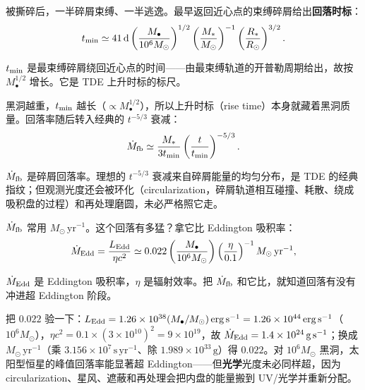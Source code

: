 被撕碎后，一半碎屑束缚、一半逃逸。最早返回近心点的束缚碎屑给出\textbf{回落时标}：
\begin{equation}
  t_{\rm min}\simeq
  41\,{\rm d}
  \left(\frac{M_\bullet}{10^6M_\odot}\right)^{1/2}
  \left(\frac{M_\ast}{M_\odot}\right)^{-1}
  \left(\frac{R_\ast}{R_\odot}\right)^{3/2}.
  \label{eq:e20-tde-fallback-time}
\end{equation}
\begin{formulaexplain}
\(t_{\rm min}\) 是最束缚碎屑绕回近心点的时间——由最束缚轨道的开普勒周期给出，故按 \(M_\bullet^{1/2}\) 增长。它是 TDE 上升时标的标尺。
\end{formulaexplain}
黑洞越重，\(t_{\rm min}\) 越长（\(\propto M_\bullet^{1/2}\)），所以上升时标（rise time）本身就藏着黑洞质量。回落率随后转入经典的 \(t^{-5/3}\) 衰减：
\begin{equation}
  \dot M_{\rm fb}\simeq
  \frac{M_\ast}{3t_{\rm min}}
  \left(\frac{t}{t_{\rm min}}\right)^{-5/3}.
  \label{eq:e20-tde-fallback-rate}
\end{equation}
\begin{formulaexplain}
\(\dot M_{\rm fb}\) 是碎屑回落率。理想的 \(t^{-5/3}\) 衰减来自碎屑能量的均匀分布，是 TDE 的经典指纹；但观测光度还会被环化（circularization，碎屑轨道相互碰撞、耗散、绕成吸积盘的过程）和再处理磨圆，未必严格照它走。
\end{formulaexplain}
\(\dot M_{\rm fb}\) 常用 \(M_\odot\,\mathrm{yr^{-1}}\)。这个回落有多猛？拿它比 Eddington 吸积率：
\begin{equation}
  \dot M_{\rm Edd}
  =
  \frac{L_{\rm Edd}}{\eta c^2}
  \simeq
  0.022
  \left(\frac{M_\bullet}{10^6M_\odot}\right)
  \left(\frac{\eta}{0.1}\right)^{-1}
  M_\odot\,{\rm yr^{-1}} ,
  \label{eq:e20-eddington-rate}
\end{equation}
\begin{formulaexplain}
\(\dot M_{\rm Edd}\) 是 Eddington 吸积率，\(\eta\) 是辐射效率。把 \(\dot M_{\rm fb}\) 和它比，就知道回落有没有冲进超 Eddington 阶段。
\end{formulaexplain}
把 \(0.022\) 验一下：\(L_{\rm Edd}=1.26\times10^{38}(M_\bullet/M_\odot)\,\mathrm{erg\,s^{-1}}=1.26\times10^{44}\,\mathrm{erg\,s^{-1}}\)（\(10^6M_\odot\)），\(\eta c^2=0.1\times(3\times10^{10})^2=9\times10^{19}\)，故 \(\dot M_{\rm Edd}=1.4\times10^{24}\,\mathrm{g\,s^{-1}}\)；换成 \(M_\odot\,\mathrm{yr^{-1}}\)（乘 \(3.156\times10^7\,\mathrm{s\,yr^{-1}}\)、除 \(1.989\times10^{33}\,\mathrm{g}\)）得 \(0.022\)。对 \(10^6M_\odot\) 黑洞，太阳型恒星的峰值回落率能显著超 Eddington——但\textbf{光学}光度未必同样超，因为 circularization、星风、遮蔽和再处理会把内盘的能量搬到 UV/光学并重新分配。

